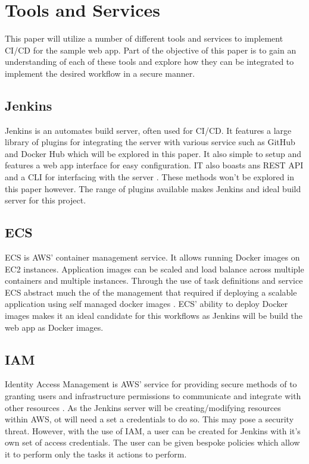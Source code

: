 \section{Tools and Services}
	This paper will utilize a number of different tools and services to implement CI/CD for the sample web app. Part of the objective of this paper is to gain an understanding of each of these tools and explore how they can be integrated to implement the desired workflow in a secure manner.

	\subsection{Jenkins} Jenkins is an automates build server, often used for CI/CD. It features a large library of plugins for integrating the server with various service such as GitHub and Docker Hub which will be explored in this paper. It also simple to setup and features a web app interface for easy configuration. IT also boasts ans REST API and a CLI for interfacing with the server \citep{jenkins}. These methods won't be explored in this paper however. The range of plugins available makes Jenkins and ideal build server for this project.
	
	\subsection{ECS} ECS is AWS' container management service. It allows running Docker images on EC2 instances.  Application images can be scaled and load balance across multiple containers and multiple instances. Through the use of task definitions and service ECS abstract much the of the management that required if deploying a scalable application using self managed docker images \citep{ecs}.  ECS' ability to deploy Docker images makes it an ideal candidate for this workflows as Jenkins will be build the web app as Docker images.
	
	\subsection{IAM} Identity Access Management is AWS' service for providing secure methods of to granting users and infrastructure permissions to communicate and integrate with other resources \citep{iam}. As the Jenkins server will be creating/modifying resources within AWS, ot will need a set a credentials to do so. This may pose a security threat. However, with the use of IAM, a user can be created for Jenkins with it's own set of access credentials. The user can be given bespoke policies which allow it to perform only the tasks it actions to perform. 